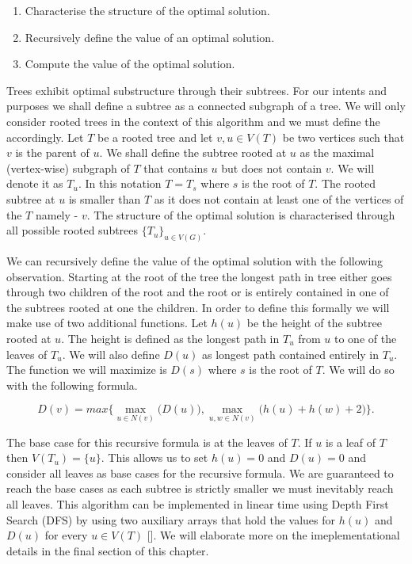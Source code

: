 \begin{enumerate}
    \item Characterise the structure of the optimal solution.
    \item Recursively define the value of an optimal solution.
    \item Compute the value of the optimal solution.
\end{enumerate}


Trees exhibit optimal substructure through their subtrees. For our intents and purposes we shall define a subtree as a connected subgraph of a tree. We will only consider rooted trees in the context of this algorithm and we must define the accordingly. Let $T$ be a rooted tree and let $v, u \in V(T)$ be two vertices such that $v$ is the parent of $u$. We shall define the subtree rooted at $u$ as the maximal (vertex-wise) subgraph of $T$ that contains $u$ but does not contain $v$.  We will denote it as $T_u$. In this notation $T = T_s$ where $s$ is the root of $T$. The rooted subtree at $u$ is smaller than $T$ as it does not contain at least one of the vertices of the $T$ namely - $v$. The structure of the optimal solution is characterised through all possible rooted subtrees $\{T_u\}_{u \in V(G)}$.

We can recursively define the value of the optimal solution with the following observation. Starting at the root of the tree the longest path in tree either goes through two children of the root and the root or is entirely contained in one of the subtrees rooted at one the children. In order to define this formally we will make use of two additional functions. Let $h(u)$ be the height of the subtree rooted at $u$. The height is defined as the longest path in $T_u$ from $u$ to one of the leaves of $T_u$. We will also define $D(u)$ as longest path contained entirely in $T_u$. The function we will maximize is $D(s)$ where $s$ is the root of $T$. We will do so with the following formula.

$$ D(v) = max\bigg\{ \max\limits_{u \in N(v)}\bigg(D(u)\bigg), \max\limits_{u, w \in N(v)}\bigg(h(u) + h(w) + 2\bigg) \bigg\}. $$

The base case for this recursive formula is at the leaves of $T$. If $u$ is a leaf of $T$ then $V(T_u) = \{u\}$. This allows us to set $h(u) = 0$ and $D(u) = 0$ and consider all leaves as base cases for the recursive formula. We are guaranteed to reach the base cases as each subtree is strictly smaller we must inevitably reach all leaves. This algorithm can be implemented in linear time using Depth First Search (DFS) by using two auxiliary arrays that hold the values for $h(u)$ and $D(u)$ for every $u \in V(T)$ []. We will elaborate more on the imeplementational details in the final section of this chapter.

